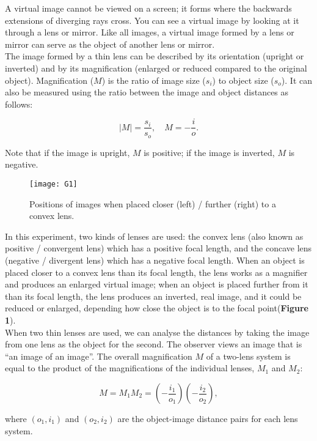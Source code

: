 \documentclass[a4paper,11pt]{article}
\begin{document}
A virtual image cannot be viewed on a screen; it forms where the backwards extensions of diverging rays cross. You can see a virtual image by looking at it through a lens or mirror. Like all images, a virtual image formed by a lens or mirror can serve as the object of another lens or mirror.\\

The image formed by a thin lens can be described by its orientation (upright or inverted) and by its magnification (enlarged or reduced compared to the original object). Magnification (\(M\)) is the ratio of image size (\(s_i\)) to object size (\(s_o\)). It can also be measured using the ratio between the image and object distances as follows:

\begin{equation}
|M| = \frac{s_i}{s_o}, \quad M = -\frac{i}{o}.
\end{equation}

Note that if the image is upright, \(M\) is positive; if the image is inverted, \(M\) is negative.
\begin{figure}[htbp]
\centering
\texttt{[image: G1]}
\caption{Positions of images when placed closer (left) / further (right) to a convex lens.}
\label{6}
\end{figure}
In this experiment, two kinds of lenses are used: the convex lens (also known as positive / convergent lens) which has a positive focal length, and the concave lens (negative / divergent lens) which has a negative focal length. When an object is placed closer to a convex lens than its focal length, the lens works as a magnifier and produces an enlarged virtual image; when an object is placed further from it than its focal length, the lens produces an inverted, real image, and it could be reduced or enlarged, depending how close the object is to the focal point(\textbf{Figure 1}).\\

When two thin lenses are used, we can analyse the distances by taking the image from one lens as the object for the second. The observer views an image that is ``an image of an image''. The overall magnification $M$ of a two-lens system is equal to the product of the magnifications of the individual lenses, $M_1$ and $M_2$:

\begin{equation}
M = M_1M_2 = \left(-\frac{i_1}{o_1}\right) \left(-\frac{i_2}{o_2}\right),
\end{equation}

where $(o_1, i_1)$ and $(o_2, i_2)$ are the object-image distance pairs for each lens system.
\end{document}

